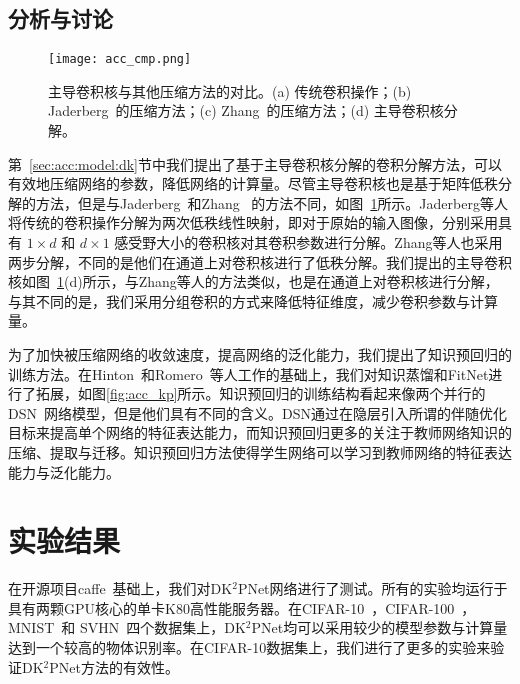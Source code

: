 \subsection{分析与讨论}
\label{sec:acc:model:discuss}

\begin{figure}
\begin{center}
\centerline{\texttt{[image: acc\_cmp.png]}}
\caption{主导卷积核与其他压缩方法的对比。(a) 传统卷积操作；(b) Jaderberg~\cite{jaderberg2014speeding}的压缩方法；(c) Zhang~\cite{zhang2015efficient}的压缩方法；(d) 主导卷积核分解。}
\label{fig:acc_cmp}
\end{center}
\end{figure} 

第~\ref{sec:acc:model:dk}节中我们提出了基于主导卷积核分解的卷积分解方法，可以有效地压缩网络的参数，降低网络的计算量。尽管主导卷积核也是基于矩阵低秩分解的方法，但是与Jaderberg~\cite{jaderberg2014speeding}和Zhang~\cite{zhang2015efficient} 的方法不同，如图~\ref{fig:acc_cmp}所示。Jaderberg等人将传统的卷积操作分解为两次低秩线性映射，即对于原始的输入图像，分别采用具有 $1{\times}d$ 和 $d{\times}1$ 感受野大小的卷积核对其卷积参数进行分解。Zhang等人也采用两步分解，不同的是他们在通道上对卷积核进行了低秩分解。我们提出的主导卷积核如图~\ref{fig:acc_cmp}(d)所示，与Zhang等人的方法类似，也是在通道上对卷积核进行分解，与其不同的是，我们采用分组卷积的方式来降低特征维度，减少卷积参数与计算量。

为了加快被压缩网络的收敛速度，提高网络的泛化能力，我们提出了知识预回归的训练方法。在Hinton~\cite{hinton2015distilling}和Romero~\cite{romero2014fitnets}等人工作的基础上，我们对知识蒸馏和FitNet进行了拓展，如图\ref{fig:acc_kp}所示。知识预回归的训练结构看起来像两个并行的DSN~\cite{lee2015deeply}网络模型，但是他们具有不同的含义。DSN通过在隐层引入所谓的伴随优化目标来提高单个网络的特征表达能力，而知识预回归更多的关注于教师网络知识的压缩、提取与迁移。知识预回归方法使得学生网络可以学习到教师网络的特征表达能力与泛化能力。

\section{实验结果}
\label{sec:acc:experiment}

在开源项目caffe~\cite{jia2014caffe}基础上，我们对DK$^2$PNet网络进行了测试。所有的实验均运行于具有两颗GPU核心的单卡K80高性能服务器。在CIFAR-10~\cite{krizhevsky2009learning}，CIFAR-100~\cite{krizhevsky2009learning}，MNIST~\cite{lecun1998gradient}和 SVHN~\cite{netzer2011reading}四个数据集上，DK$^2$PNet均可以采用较少的模型参数与计算量达到一个较高的物体识别率。在CIFAR-10数据集上，我们进行了更多的实验来验证DK$^2$PNet方法的有效性。

